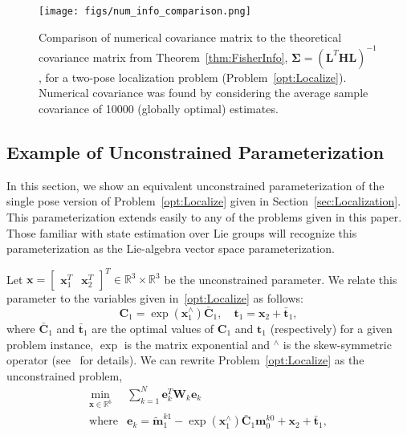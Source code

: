 \documentclass[lettersize,journal]{IEEEtran}
\begin{document}
\begin{figure}[!ht]
	\centering
	\texttt{[image: figs/num\_info\_comparison.png]}
	\caption{Comparison of numerical covariance matrix to the theoretical covariance matrix from Theorem~\ref{thm:FisherInfo}, $\bm{\Sigma} = (\bm{L}^T\bm{H}\bm{L})^{-1}$, for a two-pose localization problem (Problem~\ref{opt:Localize}). Numerical covariance was found by considering the average sample covariance of 10000 (globally optimal) estimates.}
	\label{fig:num_cov}
\end{figure}


\subsection{Example of Unconstrained Parameterization}\label{App:UncEx}

In this section, we show an equivalent unconstrained parameterization of the single pose version of Problem~\ref{opt:Localize} given in Section~\ref{sec:Localization}. This parameterization extends easily to any of the problems given in this paper. Those familiar with state estimation over Lie groups will recognize this parameterization as the Lie-algebra vector space parameterization. 

Let $\bm{x}= \begin{bmatrix} \bm{x}_1^T & \bm{x}_2^T\end{bmatrix}^T \in \mathbb{R}^3\times\mathbb{R}^3$ be the unconstrained parameter. We relate this parameter to the variables given in~\ref{opt:Localize} as follows:
\begin{equation}
	\bm{C}_1 = \exp(\bm{x}_1^\wedge)\bar{\bm{C}}_1, \quad \bm{t}_1 = \bm{x}_2 + \bar{\bm{t}}_1,
\end{equation} 
where $\bar{\bm{C}}_1$ and $\bar{\bm{t}}_1$ are the optimal values of $\bm{C}_1$ and $\bm{t}_1$ (respectively) for a given problem instance, $\exp$ is the matrix exponential and $^\wedge$ is the skew-symmetric operator (see~\cite{barfoot2011state} for details). We can rewrite Problem~\eqref{opt:Localize} as the unconstrained problem,
\begin{equation}
	\label{opt:LocalizeUnc}
	\begin{array}{rl}
		\min\limits_{\bm{x} \in \mathbb{R}^6} &\sum\limits_{k=1}^N \bm{e}_{k}^T \bm{W}_{k} \bm{e}_{k} \\
		\mbox{where} & \bm{e}_{k} = \tilde{\bm{m}}_1^{k1} - \exp(\bm{x}_1^\wedge)\bar{\bm{C}}_1\bm{m}_0^{k0} + \bm{x}_2 + \bar{\bm{t}}_1,
	\end{array}
\end{equation}
\end{document}
